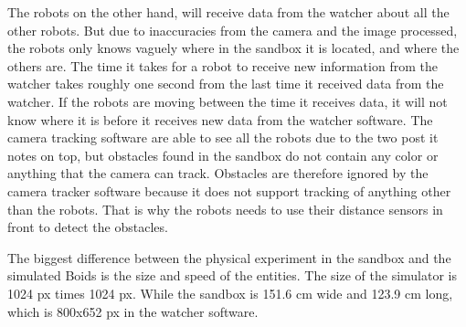 The robots on the other hand, will receive data from the watcher about all the other robots. But due to inaccuracies from the camera and the image processed, the robots only knows vaguely where in the sandbox it is located, and where the others are. The time it takes for a robot to receive new information from the watcher takes roughly one second from the last time it received data from the watcher. If the robots are moving between the time it receives data, it will not know where it is before it receives new data from the watcher software. The camera tracking software are able to see all the robots due to the two post it notes on top, but obstacles found in the sandbox do not contain any color or anything that the camera can track. Obstacles are therefore ignored by the camera tracker software because it does not support tracking of anything other than the robots. That is why the robots needs to use their distance sensors in front to detect the obstacles.

The biggest difference between the physical experiment in the sandbox and the simulated Boids is the size and speed of the entities. The size of the simulator is 1024 px times 1024 px. While the sandbox is 151.6 cm wide and 123.9 cm long, which is 800x652 px in the watcher software.

